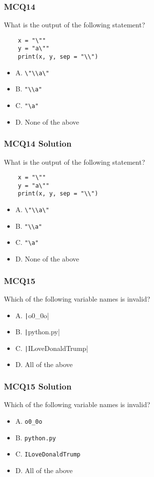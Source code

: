 \documentclass{beamer}
\newcommand{\python}[1]{\texttt|#1|}
\begin{document}
\begin{frame}[fragile]
    \frametitle{MCQ14}
    What is the output of the following statement?
    \begin{verbatim}
    x = "\""
    y = "a\""
    print(x, y, sep = "\\")
    \end{verbatim}
    \begin{itemize}
        \item A. \texttt{\textbackslash"\textbackslash\textbackslash a\textbackslash"}
        \item B. \texttt{"\textbackslash\textbackslash a"}
        \item C. \texttt{"\textbackslash a"}
        \item D. None of the above
    \end{itemize}
\end{frame}
\begin{frame}[fragile]
    \frametitle{MCQ14 Solution}
    What is the output of the following statement?
    \begin{verbatim}
    x = "\""
    y = "a\""
    print(x, y, sep = "\\")
    \end{verbatim}
    \begin{itemize}
        \item A. \texttt{\textbackslash"\textbackslash\textbackslash a\textbackslash"}
        \item B. \texttt{"\textbackslash\textbackslash a"}
        \item \alert{C. \texttt{"\textbackslash a"}}
        \item D. None of the above
    \end{itemize}
\end{frame}

\begin{frame}[fragile]
    \frametitle{MCQ15}
    Which of the following variable names is invalid?
    \begin{itemize}
        \item A. \python{o0_0o}
        \item B. \python{python.py}
        \item C. \python{ILoveDonaldTrump}
        \item D. All of the above
    \end{itemize}
\end{frame}
\begin{frame}[fragile]
    \frametitle{MCQ15 Solution}
    Which of the following variable names is invalid?
    \begin{itemize}
        \item A. \texttt{o0\_0o}
        \item \alert{B. \texttt{python.py}}
        \item C. \texttt{ILoveDonaldTrump}
        \item D. All of the above
    \end{itemize}
\end{frame}
\end{document}
